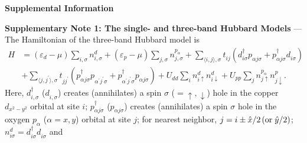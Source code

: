 \documentclass[11pt,superscriptaddress,floatfix,notitlepage]{revtex4-1}
\begin{document}
 

\begin{center}
    \Large{\bf Supplemental Information}
\end{center}

\noindent\textbf{Supplementary Note 1: The single- and three-band Hubbard Models} --- 
The Hamiltonian of the three-band Hubbard model is  
\begin{equation}
\begin{split}
H&=(\varepsilon_d-\mu)\sum_{i,\sigma}n_{i,\sigma}^d+ (\varepsilon_p-\mu)\sum_{j,\sigma} n^{p_\alpha}_{j,\sigma} 
+ \sum_{\langle  i,j\rangle,\sigma}t^{\phantom\dagger}_{ij}(d^\dagger_{i\sigma}p^{\phantom\dagger}_{\alpha j\sigma}+p^\dagger_{\alpha  j\sigma}d^{\phantom\dagger}_{i\sigma})\\
&+\sum_{\langle j,j^\prime \rangle,\sigma} t^{\phantom\dagger}_{jj^\prime}(p^\dagger_{\alpha j\sigma}p^{\phantom\dagger}_{\alpha^\prime j^\prime\sigma}+p^\dagger_{\alpha^\prime j^\prime\sigma}p^{\phantom\dagger}_{\alpha j\sigma}) + U^{\phantom\dagger}_{dd} \sum_i n^d_{i\uparrow}n^d_{i\downarrow} + U^{\phantom\dagger}_{pp} \sum_{j} n^{p_\alpha}_{j\uparrow}n^p_{j\downarrow}. 
\label{threeband}
\end{split} 
\end{equation}
Here, $d^\dagger_{i,\sigma}$ ($d^{\phantom\dagger}_{i,\sigma}$) creates (annihilates) a spin $\sigma$ ($=\uparrow,\downarrow$) hole in the copper $d_{x^2-y^2}$ orbital at site $i$;  $p^\dagger_{\alpha j\sigma}$ ($p^{\phantom\dagger}_{\alpha j\sigma}$) creates (annihilates) a spin $\sigma$ hole in the oxygen $p_\alpha$ ($\alpha = x,y$) orbital at site $j$; for nearest neighbor, $j=i\pm \hat{x}/2 \hspace{0.05cm} (\text{or} \hspace{0.1cm} \hat{y}/2)$; $n^d_{i\sigma}=d^\dagger_{i\sigma}d^{\phantom\dagger}_{i\sigma}$ and 
\end{document}
